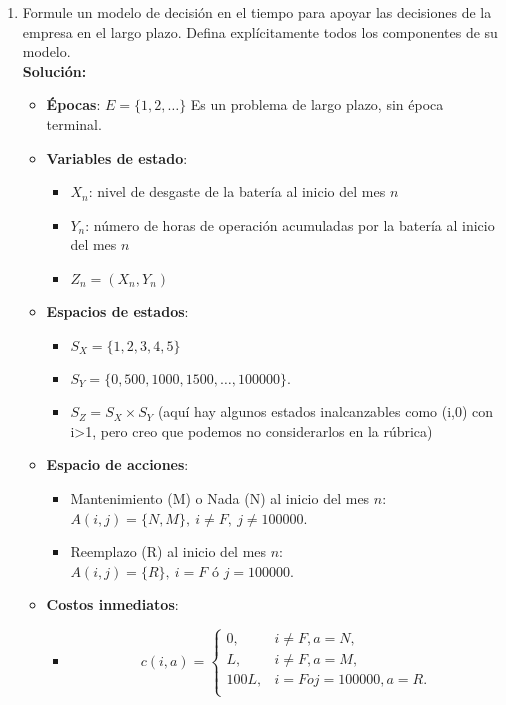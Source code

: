 \begin{enumerate}
	\item Formule un modelo de decisión en el tiempo para apoyar las decisiones de la empresa en el largo plazo. 
Defina explícitamente todos los componentes de su modelo. \\ 

\noindent \textbf{Solución:}\\

\begin{itemize}
	\item[] \textbf{Épocas}: $E=\{1,2,\dots\}$
	Es un problema de largo plazo, sin época terminal. 
	
	\item[] \textbf{Variables de estado}:
	\begin{itemize}
		\item[] $X_n$: nivel de desgaste de la batería al inicio del mes $n$
		\item[] $Y_n$: número de horas de operación acumuladas por la batería al inicio del mes $n$
		\item[] $Z_n = (X_n,Y_n)$
	\end{itemize}
		
	\item[] \textbf{Espacios de estados}:
	\begin{itemize}
		\item $S_X = \{1, 2, 3, 4, 5\}$ 
		\item $S_Y = \{0, 500, 1000, 1500, \dots, 100000\}$. 
		\item $S_Z = S_X \times S_Y$ (aquí hay algunos estados inalcanzables como (i,0) con i>1, pero creo que podemos no considerarlos en la rúbrica)
	\end{itemize}
		
		
	\item[] \textbf{Espacio de acciones}:
	\begin{itemize}
		\item[] Mantenimiento (M) o Nada (N) al inicio del mes $n$: $A(i,j) = \{N,M\},\ i \neq F,\ j\neq 100000$. 
		\item[] Reemplazo (R) al inicio del mes $n$: $A(i,j) = \{R\},\ i = F \text{ ó } j = 100000$.
	\end{itemize}
	
	\item[] \textbf{Costos inmediatos}:
	\begin{itemize}
		\item[] \[c(i,a) = 
		\begin{cases}
		0,							& i\neq F, a = N, \\ 
		L, 							& i\neq F, a = M, \\ 
		100L,  					& i=F o j=100000, a = R. \\ 
		\end{cases} \]
		

\end{itemize}
\end{itemize}
\end{enumerate}
